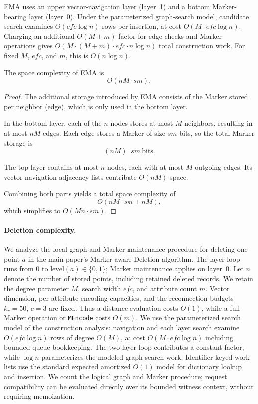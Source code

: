 EMA uses an upper vector-navigation layer (layer~1) and a bottom Marker-bearing layer (layer~0).
Under the parameterized graph-search model, candidate search examines $O(efc\log n)$ rows per insertion, at cost $O(M\cdot efc\log n)$.
Charging an additional $O(M+m)$ factor for edge checks and Marker operations gives $O(M\cdot(M+m)\cdot efc\cdot n\log n)$ total construction work.
For fixed $M$, $efc$, and $m$, this is $O(n\log n)$.


\begin{theorem}
The space complexity of EMA is
\[
O(nM\cdot sm),
\]
\end{theorem}

\begin{proof}
The additional storage introduced by EMA consists of the Marker stored per neighbor (edge), which is only used in the bottom layer.

In the bottom layer, each of the $n$ nodes stores at most $M$ neighbors, resulting in at most $nM$ edges.
Each edge stores a Marker of size $sm$ bits, so the total Marker storage is
\[
(nM)\cdot sm\ \text{bits}.
\]

The top layer contains at most $n$ nodes, each with at most $M$ outgoing edges.
Its vector-navigation adjacency lists contribute $O(nM)$ space.

Combining both parts yields a total space complexity of
\[
O\!\left(nM\cdot sm + nM\right),
\]
which simplifies to $O(Mn\cdot sm)$.
\end{proof}

\paragraph{Deletion complexity.}
We analyze the local graph and Marker maintenance procedure for deleting one point $a$ in the main paper's Marker-aware Deletion algorithm.
The layer loop runs from $0$ to $\mathrm{level}(a)\in\{0,1\}$; Marker maintenance applies on layer~0.
Let $n$ denote the number of stored points, including retained deleted records.
We retain the degree parameter $M$, search width $efc$, and attribute count $m$.
Vector dimension, per-attribute encoding capacities, and the reconnection budgets $k_r=50$, $c=3$ are fixed.
Thus a distance evaluation costs $O(1)$, while a full Marker operation or \texttt{MEncode} costs $O(m)$.
We use the parameterized search model of the construction analysis: navigation and each layer search examine $O(efc\log n)$ rows of degree $O(M)$, at cost $O(M\cdot efc\log n)$ including bounded-queue bookkeeping.
The two-layer loop contributes a constant factor, while $\log n$ parameterizes the modeled graph-search work.
Identifier-keyed work lists use the standard expected amortized $O(1)$ model for dictionary lookup and insertion.
We count the logical graph and Marker procedure; request compatibility can be evaluated directly over its bounded witness context, without requiring memoization.

